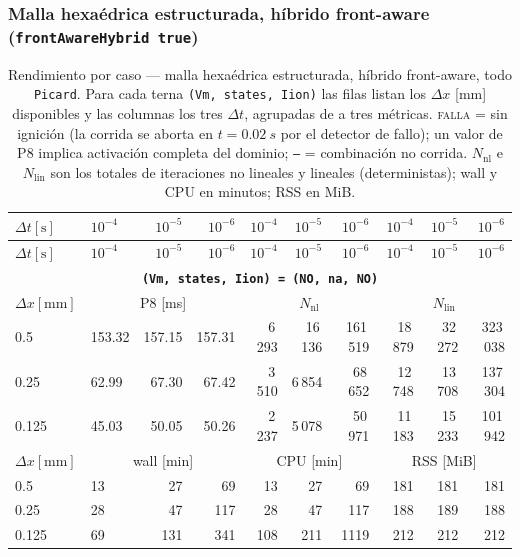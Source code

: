 \documentclass[11pt,a4paper]{article}
\newcommand{\code}[1]{\texttt{\small #1}}
\begin{document}
\subsubsection{Malla hexaédrica estructurada, híbrido front-aware (\code{frontAwareHybrid true})}
\label{sec:res2d:hexaT}
\begin{center}\footnotesize
\begin{longtable}{l|lrr|rrr|rrr}
\caption{Rendimiento por caso --- malla hexa\'edrica estructurada, h\'ibrido front-aware, todo \code{Picard}. Para cada terna \code{(Vm, states, Iion)} las filas listan los $\Delta x$ [mm] disponibles y las columnas los tres $\Delta t$, agrupadas de a tres m\'etricas. \textsc{falla} = sin ignici\'on (la corrida se aborta en $t=\SI{0.02}{s}$ por el detector de fallo); un valor de P8 implica activaci\'on completa del dominio; \texttt{--} = combinaci\'on no corrida. $N_{\mathrm{nl}}$ e $N_{\mathrm{lin}}$ son los totales de iteraciones no lineales y lineales (deterministas); wall y CPU en minutos; RSS en MiB.}\label{tab:res2d:hexaT}\\
\toprule $ \Delta t [\text{s}]$ & $10^{-4}$ & $10^{-5}$ & $10^{-6}$ & $10^{-4}$ & $10^{-5}$ & $10^{-6}$ & $10^{-4}$ & $10^{-5}$ & $10^{-6}$\\ \midrule\endfirsthead
\toprule $ \Delta t [\text{s}]$ & $10^{-4}$ & $10^{-5}$ & $10^{-6}$ & $10^{-4}$ & $10^{-5}$ & $10^{-6}$ & $10^{-4}$ & $10^{-5}$ & $10^{-6}$\\ \midrule\endhead
\multicolumn{10}{c}{\textbf{\code{(Vm, states, Iion) = (NO, na, NO)}}}\\\hline
$ \Delta x [\text{mm}] $ & \multicolumn{3}{c|}{P8 [ms]} & \multicolumn{3}{c|}{$N_{\mathrm{nl}}$} & \multicolumn{3}{c|}{$N_{\mathrm{lin}}$}\\
0.5 & 153.32 & 157.15 & 157.31 & 6\,293 & 16\,136 & 161\,519 & 18\,879 & 32\,272 & 323\,038\\
0.25 & 62.99 & 67.30 & 67.42 & 3\,510 & 6\,854 & 68\,652 & 12\,748 & 13\,708 & 137\,304\\
0.125 & 45.03 & 50.05 & 50.26 & 2\,237 & 5\,078 & 50\,971 & 11\,183 & 15\,233 & 101\,942\\
\hline
$ \Delta x [\text{mm}] $ & \multicolumn{3}{c|}{wall [min]} & \multicolumn{3}{c|}{CPU [min]} & \multicolumn{3}{c|}{RSS [MiB]}\\
0.5 & 13 & 27 & 69 & 13 & 27 & 69 & 181 & 181 & 181\\
0.25 & 28 & 47 & 117 & 28 & 47 & 117 & 188 & 189 & 188\\
0.125 & 69 & 131 & 341 & 108 & 211 & 1119 & 212 & 212 & 212\\

\end{longtable}
\end{center}
\end{document}

